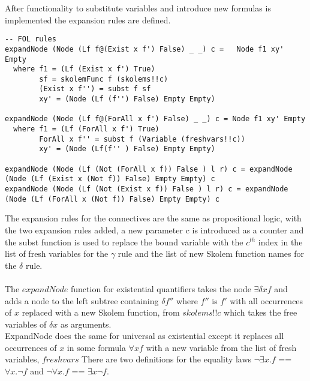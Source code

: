 \documentclass{article}%
\begin{document}
After functionality to substitute variables and introduce new formulas is implemented the expansion rules are defined. 
\begin{verbatim}
-- FOL rules 
expandNode (Node (Lf f@(Exist x f') False) _ _) c =   Node f1 xy' Empty
  where f1 = (Lf (Exist x f') True)
        sf = skolemFunc f (skolems!!c)
        (Exist x f'') = subst f sf
        xy' = (Node (Lf (f'') False) Empty Empty) 

expandNode (Node (Lf f@(ForAll x f') False) _ _) c = Node f1 xy' Empty
  where f1 = (Lf (ForAll x f') True)
        ForAll x f'' = subst f (Variable (freshvars!!c))
        xy' = (Node (Lf(f'' ) False) Empty Empty)  

expandNode (Node (Lf (Not (ForAll x f)) False ) l r) c = expandNode (Node (Lf (Exist x (Not f)) False) Empty Empty) c
expandNode (Node (Lf (Not (Exist x f)) False ) l r) c = expandNode (Node (Lf (ForAll x (Not f)) False) Empty Empty) c
\end{verbatim}
The expansion rules for the connectives are the same as propositional logic, with the two expansion rules added, a new parameter c is introduced as a counter and the subst function is used to replace the bound variable with the $c^{th}$ index in the list of fresh variables for the $\gamma$ rule and the list of new Skolem function names for the $\delta$ rule.\\\\
  The $expandNode$ function for existential quantifiers takes the node $\exists\delta{x}f$ and adds a node to the left subtree containing $\delta{f''}$ where $f''$ is $f'$ with all occurrences of $x$ replaced with a new Skolem function, from $skolems!!c$ which takes the free variables of $\delta{x}$ as arguments. \\
ExpandNode does the same for universal as existential except it replaces all occurrences of $x$ in some formula $\forall{x}f$ with a new variable from the list of fresh variables, $freshvars$
There are two definitions for the equality laws $\neg\exists{x.f}$ == $\forall{x.}\neg{f}$ and $\neg\forall{x.f}$ == $\exists{x}\neg{f}$. \\
\end{document}
